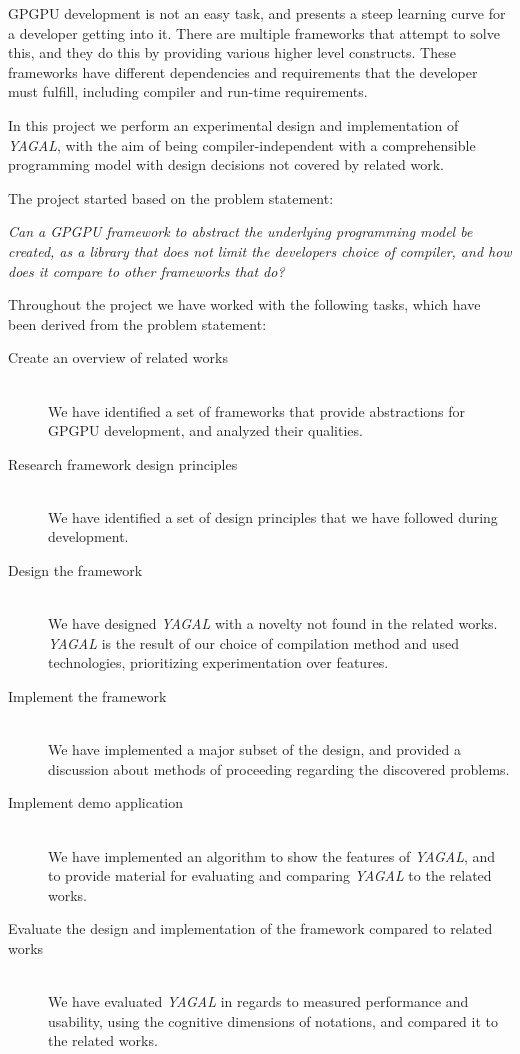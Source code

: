 GPGPU development is not an easy task, and presents a steep learning curve for a developer getting into it. There are multiple frameworks that attempt to solve this, and they do this by providing various higher level constructs. These frameworks have different dependencies and requirements that the developer must fulfill, including compiler and run-time requirements. 

In this project we perform an experimental design and implementation of \textit{YAGAL}, with the aim of being compiler-independent with a comprehensible programming model with design decisions not covered by related work.

The project started based on the problem statement:

\textit{Can a GPGPU framework to abstract the underlying programming model be created, as a library that does not limit the developers choice of compiler, and how does it compare to other frameworks that do?}

Throughout the project we have worked with the following tasks, which have been derived from the problem statement:

\begin{description}
\item[Create an overview of related works]\hfill \\
We have identified a set of frameworks that provide abstractions for GPGPU development, and analyzed their qualities.
\item[Research framework design principles]\hfill \\
We have identified a set of design principles that we have followed during development.
\item[Design the framework]\hfill \\
We have designed \textit{YAGAL} with a novelty not found in the related works. \textit{YAGAL} is the result of our choice of compilation method and used technologies, prioritizing experimentation over features.
\item[Implement the framework]\hfill \\
We have implemented a major subset of the design, and provided a discussion about methods of proceeding regarding the discovered problems. 
\item[Implement demo application]\hfill \\
We have implemented an algorithm to show the features of \textit{YAGAL}, and to provide material for evaluating and comparing \textit{YAGAL} to the related works.
\item[Evaluate the design and implementation of the framework compared to related works]\hfill \\
We have evaluated \textit{YAGAL} in regards to measured performance and usability, using the cognitive dimensions of notations, and compared it to the related works.
\end{description}

